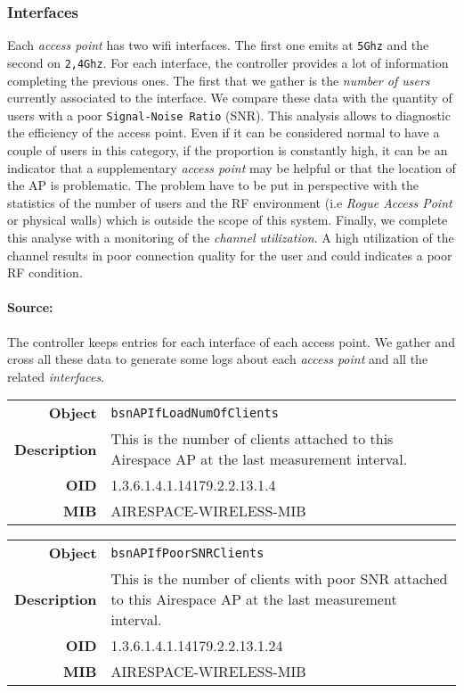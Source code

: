 \subsubsection*{Interfaces}
Each \emph{access point} has two wifi interfaces. The first one emits at \texttt{5Ghz} and the second on \texttt{2,4Ghz}. For each interface, the controller provides a lot of information completing the previous ones. The first that we gather is the \textit{number of users} currently associated to the interface. We compare these data with the quantity of users with a poor \texttt{Signal-Noise Ratio} (SNR). This analysis allows to diagnostic the efficiency of the access point. Even if it can be considered normal to have a couple of users in this category, if the proportion is constantly high, it can be an indicator that a supplementary \emph{access point} may be helpful or that the location of the AP is problematic. The problem have to be put in perspective with the statistics of the number of users and the RF environment (i.e \emph{Rogue Access Point} or physical walls) which is outside the scope of this system. 
Finally, we complete this analyse with a monitoring of the \emph{channel utilization}. A high utilization of the channel results in poor connection quality for the user and could indicates a poor RF condition.

\paragraph*{Source:} The controller keeps entries for each interface of each access point. We gather and cross all these data to generate some logs about each \emph{access point} and all the related \emph{interfaces}.

\begin{tabular}{|r l|}
\hline
\textbf{Object} & \texttt{bsnAPIfLoadNumOfClients} \\
\textbf{Description} & \parbox{11cm}{This is the number of clients attached to this Airespace AP at the last measurement interval.} \\
\textbf{OID} & 1.3.6.1.4.1.14179.2.2.13.1.4 \\
\textbf{MIB} & AIRESPACE-WIRELESS-MIB \\
\hline
\end{tabular}

\begin{tabular}{|r l|}
\hline
\textbf{Object} & \texttt{bsnAPIfPoorSNRClients} \\
\textbf{Description} & \parbox{11cm}{This is the number of clients with poor SNR attached to this Airespace AP at the last measurement interval.} \\
\textbf{OID} & 1.3.6.1.4.1.14179.2.2.13.1.24 \\
\textbf{MIB} & AIRESPACE-WIRELESS-MIB \\
\hline
\end{tabular}

